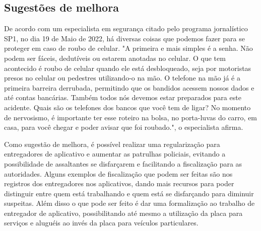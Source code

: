     \subsection{Sugestões de melhora}

        De acordo com um especialista em segurança citado pelo programa jornalístico SP1, no dia 
        19 de Maio de 2022, há diversas coisas que podemos fazer para se proteger em caso de
        roubo de celular. "A primeira e mais simples é a senha. Não podem ser fáceis, dedutíveis
        ou estarem anotadas no celular. O que tem acontecido é roubo de celular quando ele está
        desbloqueado, seja por motoristas presos no celular ou pedestres utilizando-o na mão. O
        telefone na mão já é a primeira barreira derrubada, permitindo que os bandidos acessem
        nossos dados e até contas bancárias. Também todos nós devemos estar preparados para este 
        acidente. Quais são os telefones dos bancos que você tem de ligar? No momento de nervosismo,
        é importante ter esse roteiro na bolsa, no porta-luvas do carro, em casa, para você chegar
        e poder avisar que foi roubado.", o especialista afirma.

        Como sugestão de melhora, é possível realizar uma regularização para entregadores de
        aplicativo e aumentar as patrulhas policiais, evitando a possibilidade de assaltantes 
        se disfarçarem e facilitando a fiscalização para as autoridades. Alguns exemplos de 
        fiscalização que podem ser feitas são nos registros dos entregadores nos aplicativos, 
        dando mais recursos para poder distinguir entre quem está trabalhando e quem está se 
        disfarçando para diminuir suspeitas. Além disso o que pode ser feito é dar uma 
        formalização ao trabalho de entregador de aplicativo, possibilitando até mesmo a 
        utilização da placa para serviços e aluguéis ao invés da placa para veículos particulares.
